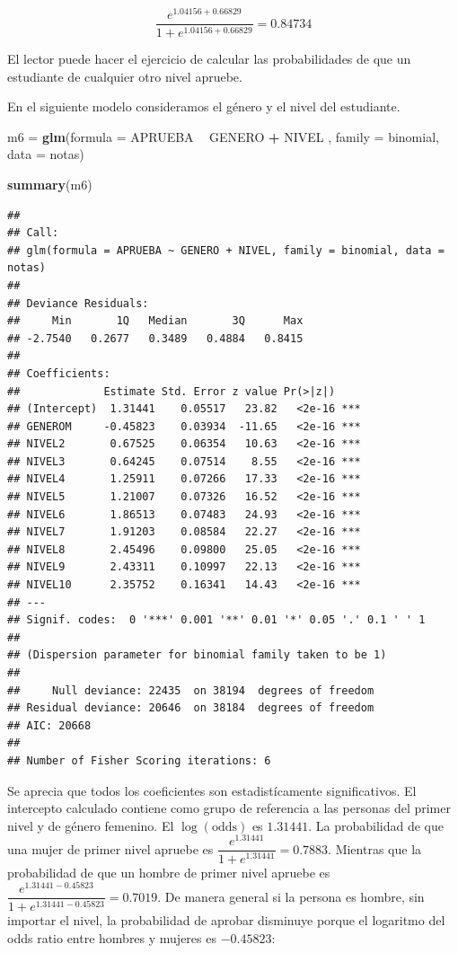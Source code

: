 \documentclass[letterpaper,]{book}
\newenvironment{Shaded}{\begin{snugshade}}{\end{snugshade}}
\newcommand{\DataTypeTok}[1]{\textcolor[rgb]{0.13,0.29,0.53}{#1}}
\newcommand{\KeywordTok}[1]{\textcolor[rgb]{0.13,0.29,0.53}{\textbf{#1}}}
\newcommand{\NormalTok}[1]{#1}
\newcommand{\OperatorTok}[1]{\textcolor[rgb]{0.81,0.36,0.00}{\textbf{#1}}}
\newcommand{\StringTok}[1]{\textcolor[rgb]{0.31,0.60,0.02}{#1}}
\begin{document}
\[\dfrac{e^{1.04156+0.66829}}{1+e^{1.04156+0.66829}}=0.84734\]

El lector puede hacer el ejercicio de calcular las probabilidades de que un estudiante de cualquier otro nivel apruebe.

En el siguiente modelo consideramos el género y el nivel del estudiante.

\begin{Shaded}
\begin{Highlighting}[]
\NormalTok{m6 =}\StringTok{ }\KeywordTok{glm}\NormalTok{(}\DataTypeTok{formula =}\NormalTok{ APRUEBA }\OperatorTok{~}\StringTok{ }\NormalTok{GENERO }\OperatorTok{+}\StringTok{ }\NormalTok{NIVEL , }\DataTypeTok{family =}\NormalTok{ binomial, }\DataTypeTok{data =}\NormalTok{ notas)}

\KeywordTok{summary}\NormalTok{(m6)}
\end{Highlighting}
\end{Shaded}

\begin{verbatim}
## 
## Call:
## glm(formula = APRUEBA ~ GENERO + NIVEL, family = binomial, data = notas)
## 
## Deviance Residuals: 
##     Min       1Q   Median       3Q      Max  
## -2.7540   0.2677   0.3489   0.4884   0.8415  
## 
## Coefficients:
##             Estimate Std. Error z value Pr(>|z|)    
## (Intercept)  1.31441    0.05517   23.82   <2e-16 ***
## GENEROM     -0.45823    0.03934  -11.65   <2e-16 ***
## NIVEL2       0.67525    0.06354   10.63   <2e-16 ***
## NIVEL3       0.64245    0.07514    8.55   <2e-16 ***
## NIVEL4       1.25911    0.07266   17.33   <2e-16 ***
## NIVEL5       1.21007    0.07326   16.52   <2e-16 ***
## NIVEL6       1.86513    0.07483   24.93   <2e-16 ***
## NIVEL7       1.91203    0.08584   22.27   <2e-16 ***
## NIVEL8       2.45496    0.09800   25.05   <2e-16 ***
## NIVEL9       2.43311    0.10997   22.13   <2e-16 ***
## NIVEL10      2.35752    0.16341   14.43   <2e-16 ***
## ---
## Signif. codes:  0 '***' 0.001 '**' 0.01 '*' 0.05 '.' 0.1 ' ' 1
## 
## (Dispersion parameter for binomial family taken to be 1)
## 
##     Null deviance: 22435  on 38194  degrees of freedom
## Residual deviance: 20646  on 38184  degrees of freedom
## AIC: 20668
## 
## Number of Fisher Scoring iterations: 6
\end{verbatim}

Se aprecia que todos los coeficientes son estadistícamente significativos. El intercepto calculado contiene como grupo de referencia a las personas del primer nivel y de género femenino. El \(\log \left( \text{odds} \right)\) es \(1.31441\). La probabilidad de que una mujer de primer nivel apruebe es \(\dfrac{e^{1.31441}}{1+e^{1.31441}}= 0.7883\). Mientras que la probabilidad de que un hombre de primer nivel apruebe es \(\dfrac{e^{1.31441-0.45823}}{1+e^{1.31441-0.45823}}= 0.7019\). De manera general si la persona es hombre, sin importar el nivel, la probabilidad de aprobar disminuye porque el logaritmo del odds ratio entre hombres y mujeres es \(-0.45823\):
\end{document}
